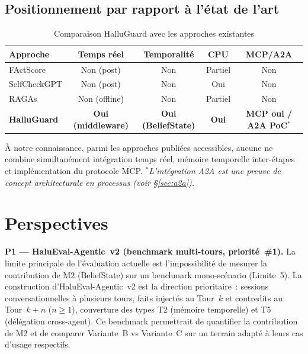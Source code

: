 \documentclass[12pt,a4paper]{article}
\begin{document}
\subsection{Positionnement par rapport à l'état de l'art}

\begin{table}[H]
\centering
\caption{Comparaison HalluGuard avec les approches existantes}
\label{tab:comparison}
\renewcommand{\arraystretch}{1.2}
\begin{tabular}{lcccc}
\toprule
\textbf{Approche} & \textbf{Temps réel} & \textbf{Temporalité} & \textbf{CPU} & \textbf{MCP/A2A} \\
\midrule
FActScore \cite{min2023factscore}       & Non (post) & Non & Partiel & Non \\
SelfCheckGPT \cite{manakul2023selfcheckgpt} & Non (post) & Non & Oui     & Non \\
RAGAs \cite{es2023ragas}                & Non (offline) & Non & Partiel & Non \\
\midrule
\rowcolor{highlight}
\textbf{HalluGuard} & \textbf{Oui (middleware)} & \textbf{Oui (BeliefState)} & \textbf{Oui} & \textbf{MCP oui / A2A PoC$^*$} \\
\bottomrule
\end{tabular}
\end{table}

À notre connaissance, parmi les approches publiées accessibles, aucune ne combine simultanément intégration temps réel, mémoire temporelle inter-étapes et implémentation du protocole MCP. \textit{$^*$L'intégration A2A est une preuve de concept architecturale en processus (voir §\ref{sec:a2a}).}

\section{Perspectives}

\textbf{P1 --- HaluEval-Agentic~v2 (benchmark multi-tours, priorité~\#1).}
La limite principale de l'évaluation actuelle est l'impossibilité de mesurer la contribution de M2 (BeliefState) sur un benchmark mono-scénario (Limite~5). La construction d'HaluEval-Agentic~v2 est la direction prioritaire~: sessions conversationnelles à plusieurs tours, faits injectés au Tour~$k$ et contredits au Tour~$k+n$ ($n \geq 1$), couverture des types T2 (mémoire temporelle) et T5 (délégation cross-agent). Ce benchmark permettrait de quantifier la contribution de M2 et de comparer Variante~B vs Variante~C sur un terrain adapté à leurs cas d'usage respectifs.
\end{document}
